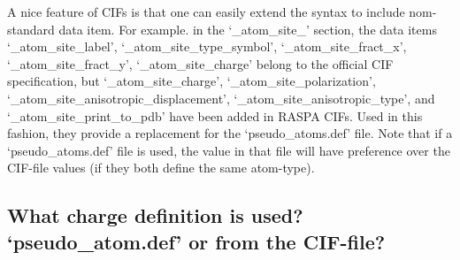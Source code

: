 A nice feature of CIFs is that one can easily extend the syntax to include nom-standard data item. For example. in the `\_atom\_site\_' section,
the data items `\_atom\_site\_label', `\_atom\_site\_type\_symbol', `\_atom\_site\_fract\_x', `\_atom\_site\_fract\_y', `\_atom\_site\_charge' belong to the official CIF specification,
but `\_atom\_site\_charge', `\_atom\_site\_polarization', `\_atom\_site\_anisotropic\_displacement', `\_atom\_site\_anisotropic\_type',
and `\_atom\_site\_print\_to\_pdb' have been added in RASPA CIFs. Used in this fashion, they provide a replacement for the `pseudo\_atoms.def' file.
Note that if a `pseudo\_atoms.def' file is used, the value in that file will have preference over the CIF-file values (if they both define the same atom-type).

\subsection{What charge definition is used? `pseudo\_atom.def' or from the CIF-file?}

